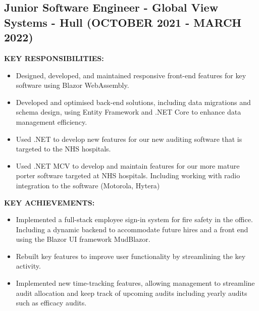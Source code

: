\documentclass{article}
\begin{document}
\subsection{Junior Software Engineer - \textnormal{Global View Systems - Hull} \footnotesize{(OCTOBER 2021 - MARCH 2022)}}
\begin{minipage}[t]{1\textwidth}
    \footnotesize{\textbf{KEY RESPONSIBILITIES:}}
    \normalsize{}
    \begin{itemize}[leftmargin=*]
        \item Designed, developed, and maintained responsive front-end features for key software using Blazor WebAssembly.
        \item Developed and optimised back-end solutions, including data migrations and schema design, using Entity Framework and .NET Core to enhance data management efficiency.
        \item Used .NET to develop new features for our new auditing software that is targeted to the NHS hospitals.
        \item Used .NET MCV to develop and maintain features for our more mature porter software targeted at NHS hospitals. Including working with radio integration to the software (Motorola, Hytera)    
    \end{itemize}
\end{minipage}
\begin{minipage}[t]{1\textwidth}
    \vspace{1em}
    \footnotesize{\textbf{KEY ACHIEVEMENTS:}}
    \normalsize{}
    \begin{itemize}[leftmargin=*]
        \item Implemented a full-stack employee sign-in system for fire safety in the office. Including a dynamic backend to accommodate future hires and a front end using the Blazor UI framework MudBlazor.
        \item Rebuilt key features to improve user functionality by streamlining the key activity.
        \item Implemented new time-tracking features, allowing management to streamline audit allocation and keep track of upcoming audits including yearly audits such as efficacy audits.
    \end{itemize}
\end{minipage}
\end{document}
